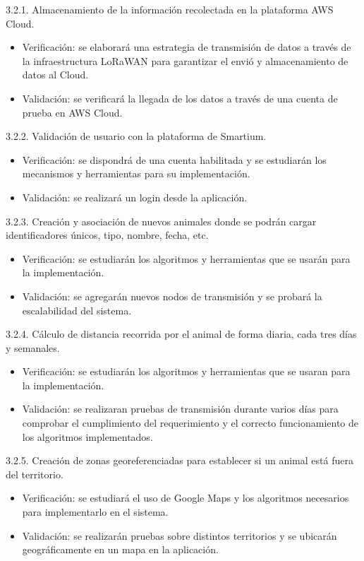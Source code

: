 \documentclass[11pt]{charter}
\begin{document}
3.2.1. Almacenamiento de la información recolectada en la plataforma AWS Cloud. 
\begin{itemize}
	\item Verificación: se elaborará una estrategia de transmisión de datos a través de la infraestructura LoRaWAN para garantizar el envió y almacenamiento de datos al Cloud. 
	\item Validación: se verificará la llegada de los datos a través de una cuenta de prueba en AWS Cloud. 
\end{itemize}

3.2.2. Validación de usuario con la plataforma de Smartium.
\begin{itemize}
	\item Verificación: se dispondrá de una cuenta habilitada y se estudiarán los mecanismos y herramientas para su implementación. 
	\item Validación: se realizará un login desde la aplicación. 
\end{itemize}

3.2.3. Creación y asociación de nuevos animales donde se podrán cargar identificadores únicos, tipo, nombre, fecha, etc. 
\begin{itemize}
	\item Verificación: se estudiarán los algoritmos y herramientas que se usarán para la implementación. 
	\item Validación: se agregarán nuevos nodos de transmisión y se probará la escalabilidad del sistema. 
\end{itemize}

3.2.4. Cálculo de distancia recorrida por el animal de forma diaria, cada tres días y semanales. 
\begin{itemize}
	\item Verificación: se estudiarán los algoritmos y herramientas que se usaran para la implementación. 
	\item Validación: se realizaran pruebas de transmisión durante varios días para comprobar el cumplimiento del requerimiento y el correcto funcionamiento de los algoritmos implementados. 
\end{itemize}

3.2.5. Creación de zonas georeferenciadas para establecer si un animal está fuera del territorio. 
\begin{itemize}
	\item Verificación: se estudiará el uso de Google Maps y los algoritmos necesarios para implementarlo en el sistema. 
	\item Validación: se realizarán pruebas sobre distintos territorios y se ubicarán geográficamente en un mapa en la aplicación. 
\end{itemize}
\end{document}
